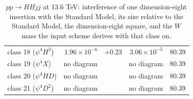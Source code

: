 \begin{table}[t]
\begin{tabular}{@{}lrrrr@{}}
class 18 ($\psi^4 H^2$) & $1.96\times 10^{-6}$ & $+0.23$ & $3.06\times 10^{-5}$ & $80.39$\\
class 19 ($\psi^4 X$) & no diagram &  & no diagram & $80.39$\\
class 20 ($\psi^4 H D$) & no diagram &  & no diagram & $80.39$\\
class 21 ($\psi^4 D^2$) & no diagram &  & no diagram & $80.39$\\
\hline\end{tabular}
\caption{$p p \to H H j j$ at 13.6 TeV: interference of one dimension-eight insertion with the Standard Model, its size relative to the Standard Model, the dimension-eight square, and the $W$ mass the input scheme derives with that class on.}\label{tab:vbf_dihiggs-hhjj}\end{table}
